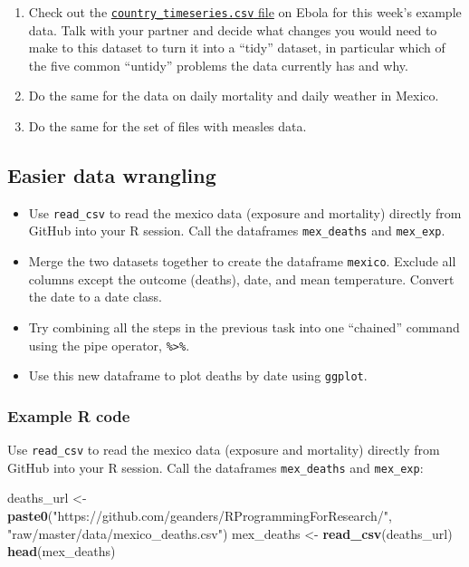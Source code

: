 \documentclass[]{book}
\makeatletter
\newenvironment{Shaded}{\begin{snugshade}}{\end{snugshade}}
\newcommand{\KeywordTok}[1]{\textcolor[rgb]{0.13,0.29,0.53}{\textbf{#1}}}
\newcommand{\StringTok}[1]{\textcolor[rgb]{0.31,0.60,0.02}{#1}}
\newcommand{\NormalTok}[1]{#1}
\providecommand{\tightlist}{%
  \setlength{\itemsep}{0pt}\setlength{\parskip}{0pt}}
\newenvironment{kframe}{%
\medskip{}
\setlength{\fboxsep}{.8em}
 \def\at@end@of@kframe{}%
 \ifinner\ifhmode%
  \def\at@end@of@kframe{\end{minipage}}%
  \begin{minipage}{\columnwidth}%
 \fi\fi%
 \def\FrameCommand##1{\hskip\@totalleftmargin \hskip-\fboxsep
 \colorbox{shadecolor}{##1}\hskip-\fboxsep
     \hskip-\linewidth \hskip-\@totalleftmargin \hskip\columnwidth}%
 \MakeFramed {\advance\hsize-\width
   \@totalleftmargin\z@ \linewidth\hsize
   \@setminipage}}%
 {\par\unskip\endMakeFramed%
 \at@end@of@kframe}
\renewenvironment{Shaded}{\begin{kframe}}{\end{kframe}}
\theoremstyle{definition}
\theoremstyle{definition}
\theoremstyle{definition}
\theoremstyle{remark}
\makeatother
\begin{document}
\begin{enumerate}
\def\labelenumi{\arabic{enumi}.}
\tightlist
\item
  Check out the
  \href{https://github.com/geanders/RProgrammingForResearch/raw/master/data/country_timeseries.csv}{\texttt{country\_timeseries.csv}
  file} on Ebola for this week's example data. Talk with your partner
  and decide what changes you would need to make to this dataset to turn
  it into a ``tidy'' dataset, in particular which of the five common
  ``untidy'' problems the data currently has and why.
\item
  Do the same for the data on daily mortality and daily weather in
  Mexico.
\item
  Do the same for the set of files with measles data.
\end{enumerate}

\subsection{Easier data wrangling}\label{easier-data-wrangling}

\begin{itemize}
\tightlist
\item
  Use \texttt{read\_csv} to read the mexico data (exposure and
  mortality) directly from GitHub into your R session. Call the
  dataframes \texttt{mex\_deaths} and \texttt{mex\_exp}.
\item
  Merge the two datasets together to create the dataframe
  \texttt{mexico}. Exclude all columns except the outcome (deaths),
  date, and mean temperature. Convert the date to a date class.
\item
  Try combining all the steps in the previous task into one ``chained''
  command using the pipe operator, \texttt{\%\textgreater{}\%}.
\item
  Use this new dataframe to plot deaths by date using \texttt{ggplot}.
\end{itemize}

\subsubsection{Example R code}\label{example-r-code-8}

Use \texttt{read\_csv} to read the mexico data (exposure and mortality)
directly from GitHub into your R session. Call the dataframes
\texttt{mex\_deaths} and \texttt{mex\_exp}:

\begin{Shaded}
\begin{Highlighting}[]
\NormalTok{deaths_url <-}\StringTok{ }\KeywordTok{paste0}\NormalTok{(}\StringTok{"https://github.com/geanders/RProgrammingForResearch/"}\NormalTok{,}
                     \StringTok{"raw/master/data/mexico_deaths.csv"}\NormalTok{)}
\NormalTok{mex_deaths <-}\StringTok{ }\KeywordTok{read_csv}\NormalTok{(deaths_url)}
\KeywordTok{head}\NormalTok{(mex_deaths)}
\end{Highlighting}
\end{Shaded}
\end{document}
